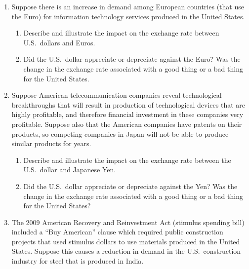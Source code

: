 \documentclass[
    letterpaper,paper=portrait,fleqn,
    DIV=16,fontsize=12pt,twoside=semi,
    parskip=full-,
    headings=standardclasses]
{scrartcl}
\begin{document}
\begin{enumerate}
\item Suppose there is an increase in demand among European countries (that use the Euro) for information
technology services produced in the United States.

\begin{enumerate}

\item Describe and illustrate the impact on the exchange rate between U.S.~dollars and Euros.

\vfill

\item Did the U.S.~dollar appreciate or depreciate against the Euro? Was the change in the exchange
rate associated with a good thing or a bad thing for the United States.

\vspace{5.0\baselineskip}

\end{enumerate}

\item Suppose American telecommunication companies reveal technological breakthroughs that will result
in production of technological devices that are highly profitable, and therefore financial investment
in these companies very profitable. Suppose also that the American companies have patents on their
products, so competing companies in Japan will not be able to produce similar products for years.

\begin{enumerate}

\item Describe and illustrate the impact on the exchange rate between the U.S.~dollar and Japanese
Yen.

\vfill

\vspace{-2.0\baselineskip}

\clearpage

\item Did the U.S.~dollar appreciate or depreciate against the Yen? Was the change in the exchange
rate associated with a good thing or a bad thing for the United States?

\vspace{5.0\baselineskip}

\end{enumerate}

\item The 2009 American Recovery and Reinvestment Act (stimulus spending bill) included a ``Buy American''
clause which required public construction projects that used stimulus dollars to use materials
produced in the United States. Suppose this causes a reduction in demand in the U.S.~construction
industry for steel that is produced in India.


\end{enumerate}
\end{document}
